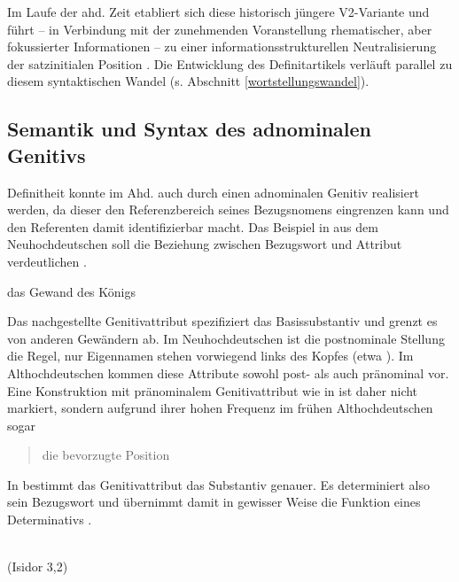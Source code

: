 Im Laufe der ahd. Zeit etabliert sich diese historisch jüngere V2-Variante und führt -- in Verbindung mit der zunehmenden Voranstellung rhematischer, aber fokussierter Informationen -- zu einer informationsstrukturellen Neutralisierung der satzinitialen Position \parencite[s.][323]{Hinterholzl2010}. Die Entwicklung des Definitartikels verläuft parallel zu diesem syntaktischen Wandel (s. Abschnitt \ref{wortstellungswandel}). 

\subsection{Semantik und Syntax des adnominalen Genitivs} \label{sec:genitiv}

Definitheit konnte im Ahd. auch durch einen adnominalen Genitiv realisiert werden, da dieser den Referenzbereich seines Bezugsnomens eingrenzen kann und den Referenten damit identifizierbar macht. Das Beispiel in  aus dem Neuhochdeutschen soll die Beziehung zwischen Bezugswort und Attribut verdeutlichen \parencite[s. auch][67f.]{Szczepaniak2011a}. 
  
\begin{exe}
	\ex \label{ex:genitiv}   
	das Gewand des Königs
\end{exe}

\noindent
Das nachgestellte Genitivattribut  spezifiziert das Basissubstantiv   und grenzt es von anderen Gewändern ab. Im Neuhochdeutschen ist die postnominale Stellung die Regel, nur Eigennamen stehen vorwiegend links des Kopfes (etwa ). Im Althochdeutschen kommen diese Attribute sowohl post- als auch pränominal vor. Eine Konstruktion mit pränominalem Genitivattribut wie in  ist daher nicht markiert, sondern aufgrund ihrer hohen Frequenz im frühen Althochdeutschen sogar  \blockcquote[231]{Oubouzar1997}{die bevorzugte Position}. In  bestimmt das Genitivattribut  das Substantiv  genauer. Es determiniert also sein Bezugswort und übernimmt damit in gewisser Weise die Funktion eines Determinativs  \parencite[236]{Oubouzar1997}.

\begin{exe}
	\ex \label{ex:genitiv-ahd}   
	   \\
	 (Isidor 3,2)
\end{exe}
	
